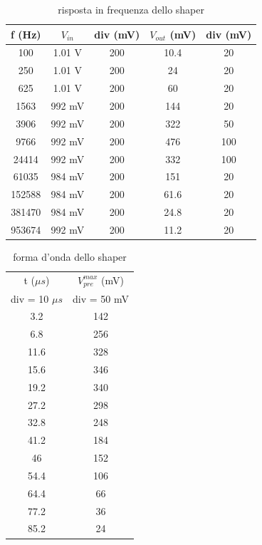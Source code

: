 \documentclass{article}
\begin{document}
\begin{table}[H]
    \centering
    \begin{tabular}{ccccc}
        \toprule
        f (Hz) & $V_{in}$ & div (mV) & $V_{out}$ (mV) & div (mV)\\
        \midrule
        100 & 1.01 V & 200 & 10.4 & 20\\
        250 & 1.01 V& 200 & 24 & 20\\
        625 & 1.01 V& 200 & 60 & 20\\
        1563 & 992 mV & 200 & 144 & 20\\
        3906 & 992 mV & 200 & 322 & 50\\
        9766 & 992 mV & 200 & 476 & 100\\
        24414 & 992 mV & 200 & 332 & 100\\
        61035 & 984 mV & 200 & 151 & 20\\
        152588 & 984 mV & 200 & 61.6 & 20\\
        381470 & 984 mV & 200 & 24.8 & 20\\
        953674 & 992 mV & 200 & 11.2 & 20\\
        \bottomrule
    \end{tabular}
    \caption{risposta in frequenza dello shaper}
\end{table}

\begin{table}[H]
    \centering
    \begin{tabular}{cc}
        \toprule
        t ($\mu s$)& $V_{pre}^{max}$ (mV) \\
        div = 10 $\mu s$ & div = 50 mV\\
        \midrule
        3.2 & 142 \\
        6.8 & 256 \\
        11.6 & 328 \\
        15.6 & 346 \\
        19.2 & 340 \\
        27.2 & 298 \\
        32.8 & 248 \\
        41.2 & 184 \\
        46 & 152 \\
        54.4 & 106 \\
        64.4 & 66 \\
        77.2 & 36 \\
        85.2 & 24 \\
        \bottomrule
    \end{tabular}
    \caption{forma d'onda dello shaper}
\end{table}
\end{document}
